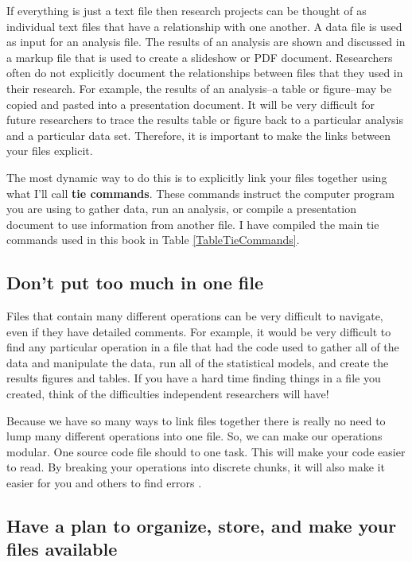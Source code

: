 If everything is just a text file then research projects can be thought of as individual text files that have a relationship with one another. A data file is used as input for an analysis file. The results of an analysis are shown and discussed in a markup file that is used to create a slideshow or PDF document. Researchers often do not explicitly document the relationships between files that they used in their research. For example, the results of an analysis--a table or figure--may be copied and pasted into a presentation document. It will be very difficult for future researchers to trace the results table or figure back to a particular analysis and a particular data set. Therefore, it is important to make the links between your files explicit. 

The most dynamic way to do this is to explicitly link your files together using what I'll call {\bf{tie commands}}.  These commands instruct the computer program you are using to gather data, run an analysis, or compile a presentation document to use information from another file. I have compiled the main tie commands used in this book in Table \ref{TableTieCommands}.

\subsection{Don't put too much in one file}

Files that contain many different operations can be very difficult to navigate, even if they have detailed comments. For example, it would be very difficult to find any particular operation in a file that had the code used to gather all of the data and manipulate the data, run all of the statistical models, and create the results figures and tables. If you have a hard time finding things in a file you created, think of the difficulties independent researchers will have! 

Because we have so many ways to link files together there is really no need to lump many different operations into one file. So, we can make our operations modular. One source code file should to one task. This will make your code easier to read. By breaking your operations into discrete chunks, it will also make it easier for you and others to find errors \cite[490]{Nagler1995}.  

\subsection{Have a plan to organize, store, and make your files available}


